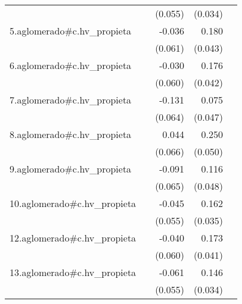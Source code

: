 {\begin{longtable}{l*{4}{D{.}{.}{-1}}}
            &                     &     (0.055)         &     (0.034)         &                     \\
\addlinespace
5.aglomerado#c.hv\_propieta&                     &      -0.036         &       0.180\sym{***}&                     \\
            &                     &     (0.061)         &     (0.043)         &                     \\
\addlinespace
6.aglomerado#c.hv\_propieta&                     &      -0.030         &       0.176\sym{***}&                     \\
            &                     &     (0.060)         &     (0.042)         &                     \\
\addlinespace
7.aglomerado#c.hv\_propieta&                     &      -0.131\sym{*}  &       0.075         &                     \\
            &                     &     (0.064)         &     (0.047)         &                     \\
\addlinespace
8.aglomerado#c.hv\_propieta&                     &       0.044         &       0.250\sym{***}&                     \\
            &                     &     (0.066)         &     (0.050)         &                     \\
\addlinespace
9.aglomerado#c.hv\_propieta&                     &      -0.091         &       0.116\sym{*}  &                     \\
            &                     &     (0.065)         &     (0.048)         &                     \\
\addlinespace
10.aglomerado#c.hv\_propieta&                     &      -0.045         &       0.162\sym{***}&                     \\
            &                     &     (0.055)         &     (0.035)         &                     \\
\addlinespace
12.aglomerado#c.hv\_propieta&                     &      -0.040         &       0.173\sym{***}&                     \\
            &                     &     (0.060)         &     (0.041)         &                     \\
\addlinespace
13.aglomerado#c.hv\_propieta&                     &      -0.061         &       0.146\sym{***}&                     \\
            &                     &     (0.055)         &     (0.034)         &                     \\

\end{longtable}}
